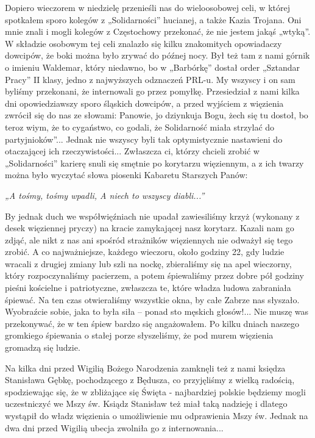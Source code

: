 Dopiero wieczorem w niedzielę przenieśli nas do wieloosobowej celi, w której spotkałem sporo kolegów z „Solidarności” hucianej, a także Kazia Trojana. Oni mnie znali i mogli kolegów z Częstochowy przekonać, że nie jestem jakąś „wtyką”. W składzie osobowym tej celi znalazło się kilku znakomitych opowiadaczy dowcipów, że boki można było zrywać do późnej nocy. Był też tam z nami górnik o imieniu Waldemar, który niedawno, bo w „Barbórkę” dostał order „Sztandar Pracy” II klasy, jedno z najwyższych odznaczeń PRL-u. My wszyscy i on sam byliśmy przekonani, że internowali go przez pomyłkę. Przesiedział z nami kilka dni opowiedziawszy sporo śląskich dowcipów, a przed wyjściem z więzienia zwrócił się do nas ze słowami: Panowie, jo dziynkuja Bogu, żech się tu dostoł, bo teroz wiym, że to cygaństwo, co godali, że Solidarność miała strzylać do partyjnioków”...
Jednak nie wszyscy byli tak optymistycznie nastawieni do otaczającej ich rzeczywistości... Zwłaszcza ci, którzy chcieli zrobić w „Solidarności” karierę snuli się smętnie po korytarzu więziennym, a z ich twarzy można było wyczytać słowa piosenki Kabaretu Starszych Panów: 
\begin{center}
\textit{„A tośmy, tośmy wpadli, 
A niech to wszyscy diabli...” }
\end{center}
By jednak duch we współwięźniach nie upadał zawiesiliśmy krzyż (wykonany z desek więziennej pryczy) na kracie zamykającej nasz korytarz. Kazali nam go zdjąć, ale nikt z nas ani spośród strażników więziennych nie odważył się tego zrobić. A co najważniejsze, każdego wieczoru, około godziny 22, gdy ludzie wracali z drugiej zmiany lub szli na nockę, zbieraliśmy się na apel wieczorny, który rozpoczynaliśmy pacierzem, a potem śpiewaliśmy przez dobre pół godziny pieśni kościelne i patriotyczne, zwłaszcza te, które władza ludowa zabraniała śpiewać. Na ten czas otwieraliśmy wszystkie okna, by całe Zabrze nas słyszało. Wyobraźcie sobie, jaka to była siła – ponad sto męskich głosów!... Nie muszę was przekonywać, że w ten śpiew bardzo się angażowałem. Po kilku dniach naszego gromkiego śpiewania o stałej porze słyszeliśmy, że pod murem więzienia gromadzą się ludzie. 

Na kilka dni przed Wigilią Bożego Narodzenia zamknęli też z nami księdza Stanisława Gębkę, pochodzącego z Będusza, co przyjęliśmy z wielką radością, spodziewając się, że w zbliżające się Święta - najbardziej polskie będziemy mogli uczestniczyć we Mszy św. Ksiądz Stanisław też miał taką nadzieję i dlatego wystąpił do władz więzienia o umożliwienie mu odprawienia  Mszy św. Jednak na dwa dni przed Wigilią ubecja zwolniła go z internowania...


